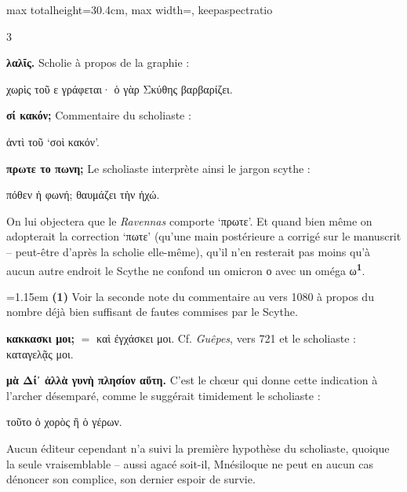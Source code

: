 \documentclass[11pt,twoside]{book}
\newcommand{\italique}[1]{\textit{#1}}
\newcommand{\citComm}[1]{\begin{quoting}[vskip=0.4pt,leftmargin=0.7em,rightmargin=0.2em]#1\end{quoting}}
\newcommand{\marqueur}[1]{\textsuperscript{\color{rubricRed}\textbf{#1}}}
\begin{document}
\begin{adjustbox}{max totalheight=30.4cm, max width=\textwidth, keepaspectratio}
\begin{minipage}{\textwidth}
{\begin{multicols}{3}
\par\vspace{1.5pt}
 \textbf{λαλῖς.} Scholie à propos de la graphie :
\citComm{χωρὶς τοῦ ε γράφεται· ὁ γὰρ Σκύθης βαρβαρίζει.}
\par\vspace{1.5pt}
 \textbf{σί κακόν;} Commentaire du scholiaste :
\citComm{ἀντὶ τοῦ `σοὶ κακόν'.}
\par\vspace{1.5pt}
 \textbf{πρωτε το πωνη;} Le scholiaste interprète ainsi le jargon scythe :
\citComm{πόθεν ἡ φωνή; θαυμάζει τὴν ἠχώ.}
\par\vspace{1.5pt}
\noindent On lui objectera que le \italique{Ravennas} comporte `πρωτε'. Et quand bien même on adopterait la correction `πωτε' (qu'une main postérieure a corrigé sur le manuscrit -- peut-être d'après la scholie elle-même), qu'il n'en resterait pas moins qu'à aucun autre endroit le Scythe ne confond un omicron ο avec un oméga ω\marqueur{1}.
\par\vspace{1.5pt}
\par\vspace{1.2pt}\par\nopagebreak\vspace{1pt}\noindent\hangindent=1.15em {\color{sepiaNote}\textbf{(1)}} Voir la seconde note du commentaire au vers 1080 à propos du nombre déjà bien suffisant de fautes commises par le Scythe.
\par\vspace{1.5pt}
 \textbf{κακκασκι μοι;} $=$ καὶ ἐγχάσκει μοι. Cf. \italique{Guêpes}, vers 721 et le scholiaste : καταγελᾷς μοι.
\par\vspace{1.5pt}
 \textbf{μὰ Δί᾽ ἀλλὰ γυνὴ πλησίον αὕτη.} C'est le chœur qui donne cette indication à l'archer désemparé, comme le suggérait timidement le scholiaste :
\citComm{τοῦτο ὁ χορὸς ἢ ὁ γέρων.}
\par\vspace{1.5pt}
\noindent Aucun éditeur cependant n'a suivi la première hypothèse du scholiaste, quoique la seule vraisemblable -- aussi agacé soit-il, Mnésiloque ne peut en aucun cas dénoncer son complice, son dernier espoir de survie.

\end{multicols}}
\end{minipage}
\end{adjustbox}
\end{document}
